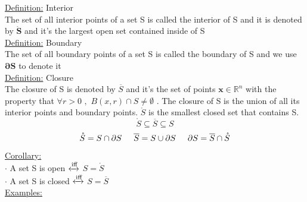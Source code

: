 \documentclass[a4paper,11pt]{article}
\renewcommand{\iff}{
  \xleftrightarrow{\text{iff}}
}
\begin{document}
 \begin{figure}[!h]
   \centering
 \end{figure}

\underline{Definition:} Interior \\
The set of all interior points of a set S is called the interior of S and it is denoted by $\mathbf{\mathring{S}}$ and it's the largest open set contained inside of S  \\
\underline{Definition:} Boundary \\
The set of all boundary points of a set S is called the boundary of S and we use $\mathbf{\partial S} $ to denote it \\
\underline{Definition:} Closure \\
The closure of S is denoted by $\overline{S}$ and it's the set of points $\mathbf{x} \in \mathbb{R}^n$ with the property that $\forall r > 0 \, \, , \, \, B(x,r) \cap S \neq \emptyset  $ . The closure of S is the union of all its interior points and boundary points. $\mathring{S}$  is the smallest closed set that contains S. \\
$$ \mathring{S} \subseteq \overline{S} \subseteq S $$ 
$$ \mathring{S} = S \cap \partial S \hspace{5mm} \overline{S} = S \cup \partial S \hspace{5mm} \partial S = \overline{S} \cap \mathring{S} $$ 

\begin{figure}[!h]
  \centering
\end{figure}

\underline{Corollary:} \\
$\cdot$ A set S is open $\iff$ $ S = \mathring{S} $ \\
$\cdot$ A set S is closed $\iff$ $S = \overline{S} $ \\

\underline{Examples:} \\ 
\end{document}
